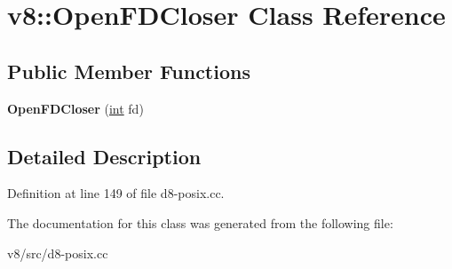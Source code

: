 \hypertarget{classv8_1_1OpenFDCloser}{}\section{v8\+:\+:Open\+F\+D\+Closer Class Reference}
\label{classv8_1_1OpenFDCloser}
\subsection*{Public Member Functions}
\begin{DoxyCompactItemize}
\item 
\mbox{\label{classv8_1_1OpenFDCloser_a06963560af61d526b81e31c4aae610a9}} 
{\bfseries Open\+F\+D\+Closer} (\mbox{\hyperlink{classint}{int}} fd)
\end{DoxyCompactItemize}


\subsection{Detailed Description}


Definition at line 149 of file d8-\/posix.\+cc.



The documentation for this class was generated from the following file\+:\begin{DoxyCompactItemize}
\item 
v8/src/d8-\/posix.\+cc\end{DoxyCompactItemize}
